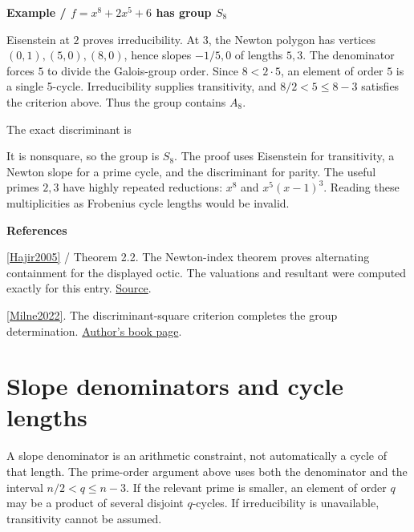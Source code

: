 \documentclass[11pt,a4paper,oneside,openany]{book}
\newcommand{\atlasdisplay}[1]{\par\begingroup\centering\vspace{3pt}\noindent\adjustbox{max width=\linewidth}{\(\displaystyle #1\)}\par\vspace{5pt}\endgroup}
\newenvironment{sources}{\par\smallskip\begingroup\footnotesize\color{atlasgray}\leftskip=10pt\setlength{\parskip}{2pt}}{\par\endgroup\smallskip}
\begin{document}
\begin{atlasblock}[standard]
\textbf{\sffamily Example  /  \(f=x^8+2x^5+6\) has group \(S_8\)}\par\smallskip
\color{black} Eisenstein at \(2\) proves irreducibility. At \(3\), the Newton polygon has vertices \((0,1),(5,0),(8,0)\), hence slopes \(-1/5,0\) of lengths \(5,3\). The denominator forces \(5\) to divide the Galois-group order. Since \(8<2\cdot5\), an element of order \(5\) is a single 5-cycle. Irreducibility supplies transitivity, and \(8/2<5\le8-3\) satisfies the criterion above. Thus the group contains \(A_8\).\par
\color{black} The exact discriminant is\par

\atlasdisplay{\operatorname{disc}(f)=2^{12}3^9\cdot79\cdot733.}

\color{black} It is nonsquare, so the group is \(S_8\). The proof uses Eisenstein for transitivity, a Newton slope for a prime cycle, and the discriminant for parity. The useful primes \(2,3\) have highly repeated reductions: \(x^8\) and \(x^5(x-1)^3\). Reading these multiplicities as Frobenius cycle lengths would be invalid.\par
\end{atlasblock}\color{black}
\begin{sources}
\textbf{References}\par\smallskip
\noindent\hyperlink{ref:Hajir2005}{[Hajir2005]} / Theorem 2.2. The Newton-index theorem proves alternating containment for the displayed octic. The valuations and resultant were computed exactly for this entry. \href{https://jtnb.centre-mersenne.org/item/JTNB_2005__17_2_517_0/}{Source}.\par
\noindent\hyperlink{ref:Milne2022}{[Milne2022]}. The discriminant-square criterion completes the group determination. \href{https://www.jmilne.org/math/Books/index.html}{Author's book page}.\par
\end{sources}\color{black}
\section{Slope denominators and cycle lengths}
\color{black} A slope denominator is an arithmetic constraint, not automatically a cycle of that length. The prime-order argument above uses both the denominator and the interval \(n/2<q\le n-3\). If the relevant prime is smaller, an element of order \(q\) may be a product of several disjoint \(q\)-cycles. If irreducibility is unavailable, transitivity cannot be assumed.\par
\end{document}
